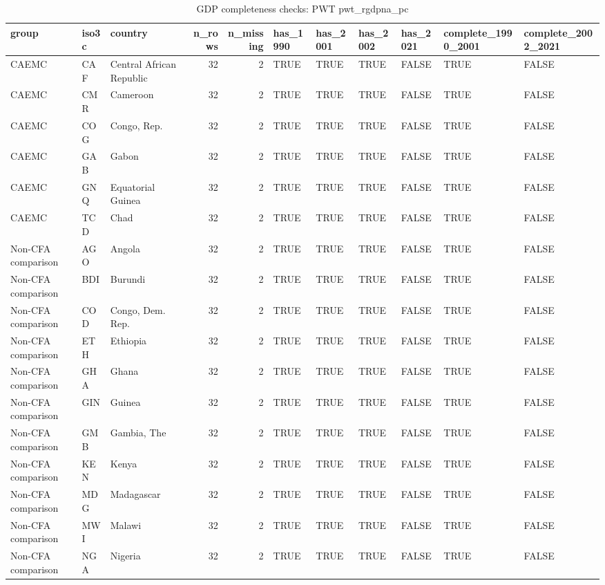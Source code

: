 \begin{table}

\caption{GDP completeness checks: PWT pwt_rgdpna_pc}
\centering
\begin{tabular}[t]{lllrrllllll}
\toprule
group & iso3c & country & n\_rows & n\_missing & has\_1990 & has\_2001 & has\_2002 & has\_2021 & complete\_1990\_2001 & complete\_2002\_2021\\
\midrule
CAEMC & CAF & Central African Republic & 32 & 2 & TRUE & TRUE & TRUE & FALSE & TRUE & FALSE\\
CAEMC & CMR & Cameroon & 32 & 2 & TRUE & TRUE & TRUE & FALSE & TRUE & FALSE\\
CAEMC & COG & Congo, Rep. & 32 & 2 & TRUE & TRUE & TRUE & FALSE & TRUE & FALSE\\
CAEMC & GAB & Gabon & 32 & 2 & TRUE & TRUE & TRUE & FALSE & TRUE & FALSE\\
CAEMC & GNQ & Equatorial Guinea & 32 & 2 & TRUE & TRUE & TRUE & FALSE & TRUE & FALSE\\
\addlinespace
CAEMC & TCD & Chad & 32 & 2 & TRUE & TRUE & TRUE & FALSE & TRUE & FALSE\\
Non-CFA comparison & AGO & Angola & 32 & 2 & TRUE & TRUE & TRUE & FALSE & TRUE & FALSE\\
Non-CFA comparison & BDI & Burundi & 32 & 2 & TRUE & TRUE & TRUE & FALSE & TRUE & FALSE\\
Non-CFA comparison & COD & Congo, Dem. Rep. & 32 & 2 & TRUE & TRUE & TRUE & FALSE & TRUE & FALSE\\
Non-CFA comparison & ETH & Ethiopia & 32 & 2 & TRUE & TRUE & TRUE & FALSE & TRUE & FALSE\\
\addlinespace
Non-CFA comparison & GHA & Ghana & 32 & 2 & TRUE & TRUE & TRUE & FALSE & TRUE & FALSE\\
Non-CFA comparison & GIN & Guinea & 32 & 2 & TRUE & TRUE & TRUE & FALSE & TRUE & FALSE\\
Non-CFA comparison & GMB & Gambia, The & 32 & 2 & TRUE & TRUE & TRUE & FALSE & TRUE & FALSE\\
Non-CFA comparison & KEN & Kenya & 32 & 2 & TRUE & TRUE & TRUE & FALSE & TRUE & FALSE\\
Non-CFA comparison & MDG & Madagascar & 32 & 2 & TRUE & TRUE & TRUE & FALSE & TRUE & FALSE\\
\addlinespace
Non-CFA comparison & MWI & Malawi & 32 & 2 & TRUE & TRUE & TRUE & FALSE & TRUE & FALSE\\
Non-CFA comparison & NGA & Nigeria & 32 & 2 & TRUE & TRUE & TRUE & FALSE & TRUE & FALSE\\

\end{tabular}
\end{table}
